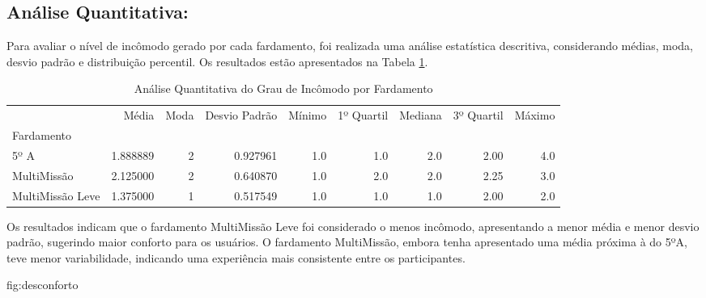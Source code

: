     \subsection{Análise Quantitativa:}
        
        Para avaliar o nível de incômodo gerado por cada fardamento, foi realizada uma análise 
        estatística descritiva, considerando médias, moda, desvio padrão e distribuição percentil. Os resultados 
        estão apresentados na Tabela \ref{tab:analise_fardamento}.
        \begin{table}[H]
                \centering
                \caption{Análise Quantitativa do Grau de Incômodo por Fardamento}
                \label{tab:analise_fardamento}
                \footnotesize
                \begin{tabular}{lrrrrrrrr}
                \toprule
                {} &     Média &  Moda &  Desvio Padrão &  Mínimo &  1º Quartil &  Mediana &  3º Quartil &  Máximo \\
                Fardamento       &           &       &                &         &             &          &             &         \\
                \midrule
                5º A             &  1.888889 &     2 &       0.927961 &     1.0 &         1.0 &      2.0 &        2.00 &     4.0 \\
                MultiMissão      &  2.125000 &     2 &       0.640870 &     1.0 &         2.0 &      2.0 &        2.25 &     3.0 \\
                MultiMissão Leve &  1.375000 &     1 &       0.517549 &     1.0 &         1.0 &      1.0 &        2.00 &     2.0 \\
                \bottomrule
                \end{tabular}
                \end{table}
    

        Os resultados indicam que o fardamento MultiMissão Leve foi considerado o menos incômodo, 
        apresentando a menor média e menor desvio padrão, sugerindo maior conforto para os usuários. 
        O fardamento MultiMissão, embora tenha apresentado uma média próxima à do 5ºA, teve menor 
        variabilidade, indicando uma experiência mais consistente entre os participantes.
            
        {fig:desconforto}


